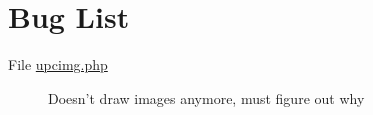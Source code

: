 \hypertarget{bug}{}\section{Bug List}\label{bug}
\label{bug__bug000001}
\hypertarget{bug__bug000001}{}
 \begin{description}
\item[File \hyperlink{upcimg_8php}{upcimg.php} ]Doesn't draw images anymore, must figure out why \end{description}
